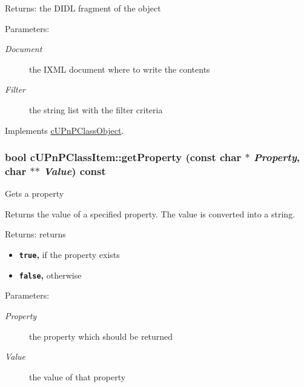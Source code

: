 \begin{Desc}
\item[Returns:]the DIDL fragment of the object \end{Desc}
\begin{Desc}
\item[Parameters:]
\begin{description}
\item[{\em Document}]the IXML document where to write the contents \item[{\em Filter}]the string list with the filter criteria \end{description}
\end{Desc}


Implements \hyperlink{classcUPnPClassObject_9090f5982129bc5aa15c6e19db627445}{cUPnPClassObject}.\hypertarget{classcUPnPClassItem_31f7010baa65cc25b95a864f05eb4e62}{
\subsubsection[{getProperty}]{\setlength{\rightskip}{0pt plus 5cm}bool cUPnPClassItem::getProperty (const char $\ast$ {\em Property}, \/  char $\ast$$\ast$ {\em Value}) const}}
\label{classcUPnPClassItem_31f7010baa65cc25b95a864f05eb4e62}


Gets a property

Returns the value of a specified property. The value is converted into a string.

\begin{Desc}
\item[Returns:]returns\begin{itemize}
\item {\bf {\tt true},} if the property exists\item {\bf {\tt false},} otherwise \end{itemize}
\end{Desc}
\begin{Desc}
\item[Parameters:]
\begin{description}
\item[{\em Property}]the property which should be returned \item[{\em Value}]the value of that property \end{description}
\end{Desc}


